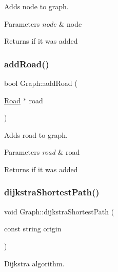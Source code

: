 Adds node to graph. 


\begin{DoxyParams}{Parameters}
{\em node} & node \\
\hline
\end{DoxyParams}
\begin{DoxyReturn}{Returns}
if it was added 
\end{DoxyReturn}
\mbox{\label{class_graph_a25d56584978abf41188f9c6c1732f19f}} 
\subsubsection{\texorpdfstring{add\+Road()}{addRoad()}}
{\footnotesize\ttfamily bool Graph\+::add\+Road (\begin{DoxyParamCaption}\item[{\mbox{\hyperlink{class_road}{Road}} $\ast$}]{road }\end{DoxyParamCaption})\hspace{0.3cm}{\ttfamily [inline]}}



Adds road to graph. 


\begin{DoxyParams}{Parameters}
{\em road} & road \\
\hline
\end{DoxyParams}
\begin{DoxyReturn}{Returns}
if it was added 
\end{DoxyReturn}
\mbox{\label{class_graph_acc8c0f30f708afa2bb067f94147fb471}} 
\subsubsection{\texorpdfstring{dijkstra\+Shortest\+Path()}{dijkstraShortestPath()}}
{\footnotesize\ttfamily void Graph\+::dijkstra\+Shortest\+Path (\begin{DoxyParamCaption}\item[{const string}]{origin }\end{DoxyParamCaption})\hspace{0.3cm}{\ttfamily [inline]}}



Dijkstra algorithm. 


